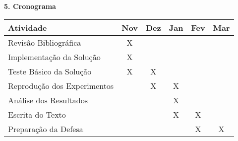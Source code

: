 \begin{flushleft}
	{\textbf{\Large{5. Cronograma}}}
\end{flushleft}
\vspace{1cm}

\begin{center}
	\begin{tabular}{|l||c||c||c||c||c|}
		\hline
		Atividade &Nov &Dez &Jan &Fev &Mar\\
		\hline
		Revisão Bibliográfica &X & & & &\\
		\hline
		Implementação da Solução &X & & & &\\
		\hline
		Teste Básico da Solução &X &X & & &\\
		\hline
		Reprodução dos Experimentos & &X &X & &\\
		\hline
		Análise dos Resultados & & &X & &\\
		\hline
		Escrita do Texto & & &X &X &\\
		\hline
		Preparação da Defesa & & & &X &X\\
		\hline
	\end{tabular}\\
\end{center}
